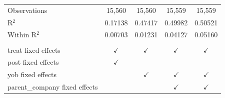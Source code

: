 \begin{table}[htbp]
\begin{tabular}{lcccc}
      Observations                   & 15,560        & 15,560        & 15,559        & 15,559\\  
      R$^2$                          & 0.17138       & 0.47417       & 0.49982       & 0.50521\\  
      Within R$^2$                   & 0.00703       & 0.01231       & 0.04127       & 0.05160\\  
       \\
      treat fixed effects            & $\checkmark$  & $\checkmark$  & $\checkmark$  & $\checkmark$\\   
      post fixed effects             & $\checkmark$  &               &               & \\  
      yob fixed effects              &               & $\checkmark$  & $\checkmark$  & $\checkmark$\\   
      parent\_company fixed effects  &               &               & $\checkmark$  & $\checkmark$\\   
      \bottomrule
   \end{tabular}
\end{table}


